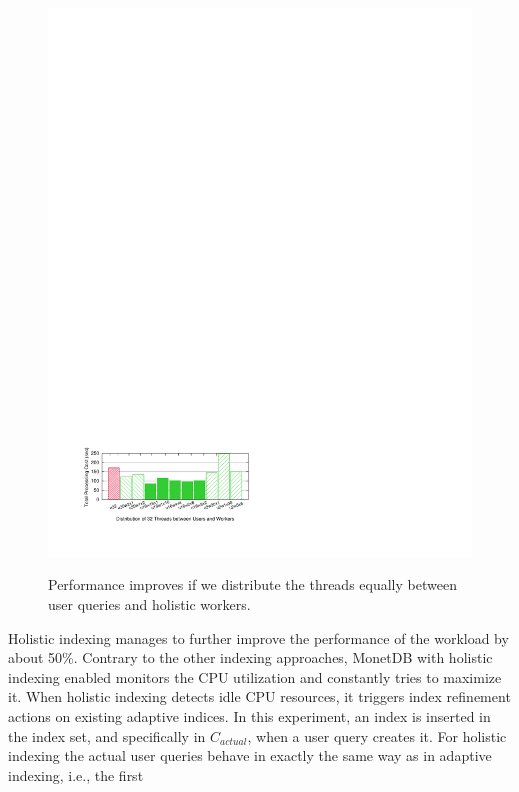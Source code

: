 \begin{figure}
\begin{center}
\includegraphics[trim=1.8cm 2cm 0cm 22.3cm]{Figures/holistic/thread_distribution}
\vspace{-0.2 in}
\caption{Performance improves if we distribute the threads equally between user queries and holistic workers.}
\vspace{-0.7 cm}
\label{fig:thread_distribution}
\end{center}
\end{figure}
Holistic indexing manages to further improve the performance of the workload by about 50\%.
Contrary to the other indexing approaches, 
MonetDB with holistic indexing enabled monitors the CPU utilization and constantly  tries to maximize it.
When holistic indexing detects idle CPU resources, it triggers index refinement actions on existing adaptive indices.
In this experiment, an index is inserted in the index set, and specifically in $C_{actual}$, when a user query creates it.
For holistic indexing the actual user queries behave in exactly the same way as in adaptive indexing, i.e., the first
